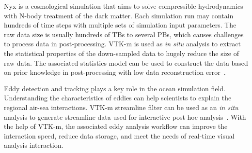 Nyx is a cosmological simulation that aims to solve compressible hydrodynamics with N-body treatment of the dark matter. Each simulation run may contain hundreds of time steps with multiple sets of simulation input parameters. The raw data size is usually hundreds of TBs to several PBs, which causes challenges to process data in post-processing. 
VTK-m is used as \emph{in situ} analysis to extract the statistical properties of the down-sampled data to hugely reduce the size of raw data. The associated statistics model can be used to construct the data based on prior knowledge in post-processing with low data reconstruction error~\cite{Wang2019}.

Eddy detection and tracking plays a key role in the ocean simulation field. Understanding the characteristics of eddies can help scientists to explain the regional air-sea interactions.
VTK-m streamline filter can be used as an \emph{in situ} analysis to generate streamline data used for interactive post-hoc analysis~\cite{Han2022}. With the help of VTK-m, the associated eddy analysis workflow can improve the interaction speed, reduce data storage, and meet the
needs of real-time visual analysis interaction.  
